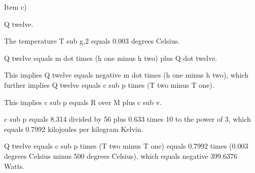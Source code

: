 Item c) 

Q twelve.

The temperature T sub g,2 equals 0.003 degrees Celsius.

Q twelve equals m dot times (h one minus h two) plus Q dot twelve.

This implies Q twelve equals negative m dot times (h one minus h two), which further implies Q twelve equals c sub p times (T two minus T one).

This implies c sub p equals R over M plus c sub v.

c sub p equals 8.314 divided by 56 plus 0.633 times 10 to the power of 3, which equals 0.7992 kilojoules per kilogram Kelvin.

Q twelve equals c sub p times (T two minus T one) equals 0.7992 times (0.003 degrees Celsius minus 500 degrees Celsius), which equals negative 399.6376 Watts.
